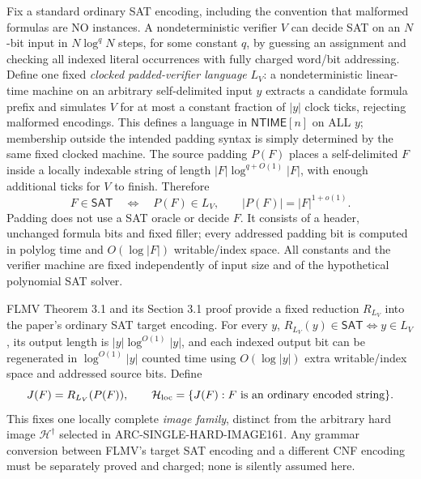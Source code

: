 \documentclass[11pt]{article}
\newcommand{\SAT}{\mathsf{SAT}}
\newcommand{\NTIME}{\mathsf{NTIME}}
\begin{document}
Fix a standard ordinary SAT encoding, including the convention that malformed formulas are NO instances. A nondeterministic verifier $V$ can decide SAT on an $N$-bit input in $N\log^{q}N$ steps, for some constant $q$, by guessing an assignment and checking all indexed literal occurrences with fully charged word/bit addressing. Define one fixed \emph{clocked padded-verifier language} $L_V$: a nondeterministic linear-time machine on an arbitrary self-delimited input $y$ extracts a candidate formula prefix and simulates $V$ for at most a constant fraction of $|y|$ clock ticks, rejecting malformed encodings. This defines a language in $\NTIME[n]$ on ALL $y$; membership outside the intended padding syntax is simply determined by the same fixed clocked machine. The source padding $P(F)$ places a self-delimited $F$ inside a locally indexable string of length $|F|\log^{q+O(1)}|F|$, with enough additional ticks for $V$ to finish. Therefore
\[
 F\in\SAT\quad\Longleftrightarrow\quad P(F)\in L_V,
 \qquad |P(F)|=|F|^{1+o(1)}.
\]
Padding does not use a SAT oracle or decide $F$. It consists of a header, unchanged formula bits and fixed filler; every addressed padding bit is computed in polylog time and $O(\log |F|)$ writable/index space. All constants and the verifier machine are fixed independently of input size and of the hypothetical polynomial SAT solver.

FLMV Theorem 3.1 and its Section 3.1 proof provide a fixed reduction $R_{L_V}$ into the paper's ordinary SAT target encoding. For every $y$, $R_{L_V}(y)\in\SAT\Longleftrightarrow y\in L_V$, its output length is $|y|\log^{O(1)}|y|$, and each indexed output bit can be regenerated in $\log^{O(1)}|y|$ counted time using $O(\log |y|)$ extra writable/index space and addressed source bits. Define
\[
 J(F)=R_{L_V}(P(F)),\qquad
 \mathcal H_{\rm loc}=\{J(F):F\text{ is an ordinary encoded string}\}.
\]
This fixes one locally complete \emph{image family}, distinct from the arbitrary hard image $\mathcal H^\dagger$ selected in ARC-SINGLE-HARD-IMAGE161. Any grammar conversion between FLMV's target SAT encoding and a different CNF encoding must be separately proved and charged; none is silently assumed here.
\end{document}
